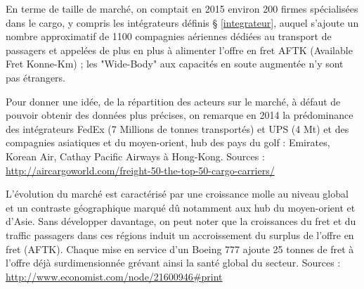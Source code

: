 En terme de taille de marché, on comptait en 2015 environ 200 firmes spécialisées dans le cargo, y compris les intégrateurs définis § \ref{integrateur}, auquel s'ajoute un nombre approximatif de 1100 compagnies aériennes dédiées au transport de passagers et appelées de plus en plus à alimenter l'offre en fret AFTK (Available Fret Konne-Km) ; les "Wide-Body" aux capacités en soute augmentée n'y sont pas étrangers.

Pour donner une idée, de la répartition des acteurs sur le marché, à défaut de pouvoir obtenir des données plus précises, on remarque en 2014 la prédominance des intégrateurs FedEx (7 Millions de tonnes transportés) et UPS (4 Mt) et des compagnies asiatiques et du moyen-orient, hub des pays du golf : Emirates, Korean Air, Cathay Pacific Airways à Hong-Kong. Sources : \url{http://aircargoworld.com/freight-50-the-top-50-cargo-carriers/} 

L'évolution du marché est caractérisé par une croissance molle au niveau global et un contraste géographique marqué dû notamment aux hub du moyen-orient et d'Asie. Sans développer davantage, on peut noter que la croissances du fret et du traffic passagers dans ces régions induit un accroissement du surplus de l'offre en fret (AFTK). Chaque mise en service d'un Boeing 777 ajoute 25 tonnes de fret 
à l'offre déjà surdimensionnée grévant ainsi la santé global du secteur. Sources : \url{http://www.economist.com/node/21600946#print}




